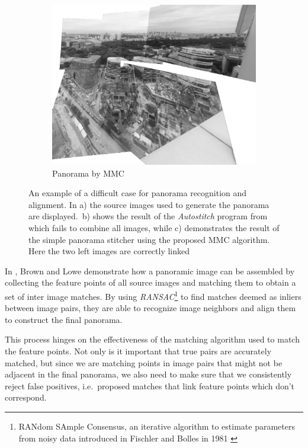 \begin{figure}[h]
\begin{subfigure}[b]{0.4\textwidth}
		\includegraphics[width=\textwidth]{images/panorama-MMC}
		\caption{Panorama by MMC}
		\label{fig:pano_MMC}
	\end{subfigure}%
    \caption{An example of a difficult case for panorama recognition and 
        alignment.  In a) the source images used to generate the 
        panorama are displayed.\ b) shows the result of the \emph{Autostitch} 
        program from \cite{brown2007automatic} which fails to combine 
        all images, while c) demonstrates the result of the simple 
        panorama stitcher
	using the proposed MMC algorithm. Here the two left images are 
correctly linked}
    \label{fig:pano_example}
\end{figure}

In \cite{brown2007automatic}, Brown and Lowe demonstrate how a panoramic 
image can be assembled by collecting the feature points of all source 
images and matching them to obtain a set of inter image matches.  By 
using \emph{RANSAC}\footnote{RANdom SAmple Consensus, an iterative 
    algorithm to estimate parameters from noisy data introduced in 
Fischler and Bolles in 1981 \cite{fischler1981ransac}} to find matches 
deemed as inliers between image pairs, they are able to recognize image 
neighbors and align them to construct the final panorama.

This process hinges on the effectiveness of the matching algorithm used 
to match the feature points. Not only is it important that true pairs 
are accurately matched, but since we are matching points in image pairs 
that might not be adjacent in the final panorama, we also need to make 
sure that we consistently reject false positives, i.e.\ proposed matches 
that link feature points which don't correspond.

